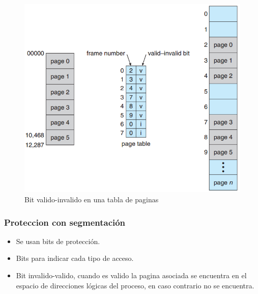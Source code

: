 \documentclass{beamer}
\begin{document}
\begin{frame}
	\begin{figure}[H]
		\centering
		\includegraphics[scale=0.6]{img/paginacion_proteccion.png}
		\caption{Bit valido-invalido en una tabla de paginas}
	\end{figure}
\end{frame}


\begin{frame}
	\frametitle{Proteccion con segmentación}
	
	\begin{itemize}
		\item Se usan bits de protección.
		\item Bits para indicar cada tipo de acceso.
		\item Bit invalido-valido, cuando es valido la pagina asociada se encuentra en el espacio de direcciones lógicas del proceso, en caso contrario no se encuentra.
	\end{itemize}
\end{frame}
\end{document}
